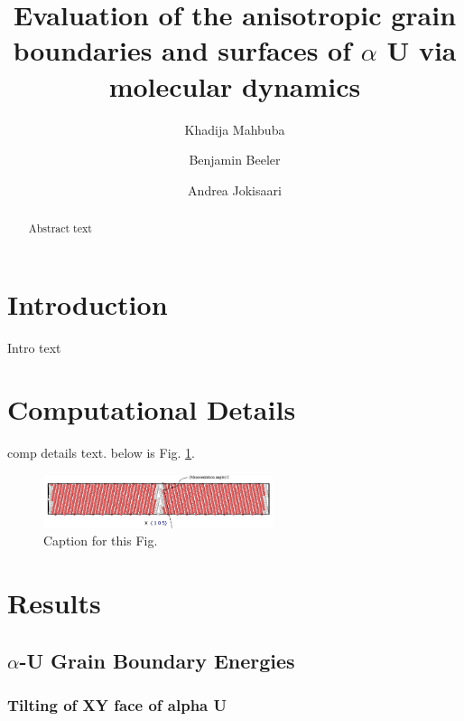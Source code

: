 \documentclass[review]{elsarticle}
\begin{document}
\begin{frontmatter}
\title{Evaluation of the anisotropic grain boundaries and surfaces of $\alpha$ U via molecular dynamics}

\author[ncsu]{Khadija Mahbuba}
\author[ncsu,inl]{Benjamin Beeler}
\author[inl]{Andrea Jokisaari}
\address[ncsu]{North Carolina State University, Raleigh, NC 27607}
\address[inl]{Idaho National Laboratory, Idaho Falls, ID 83415}

\begin{abstract}

Abstract text

\end{abstract}
\end{frontmatter}

\linenumbers

\section{Introduction}

Intro text


\FloatBarrier

\section{Computational Details}

comp details text. below is Fig. \ref{fig:grb_ex}. 

\begin{figure}[!htp]
\begin{center}
\includegraphics[width=0.6\textwidth]{Picture1}
\end{center}
\caption{Caption for this Fig.  }
\label{fig:grb_ex}
\end{figure}

\FloatBarrier

\section{Results}
\subsection{$\alpha$-U Grain Boundary Energies}
\subsubsection{Tilting of XY face of alpha U}
\end{document}
